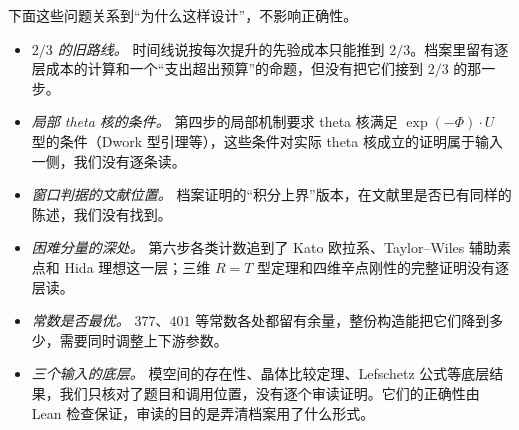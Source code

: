 \documentclass[11pt]{article}
\begin{document}
下面这些问题关系到“为什么这样设计”，不影响正确性。
\begin{itemize}
\item \emph{$2/3$ 的旧路线。} 时间线说按每次提升的先验成本只能推到 $2/3$。档案里留有逐层成本的计算和一个“支出超出预算”的命题，但没有把它们接到 $2/3$ 的那一步。
\item \emph{局部 theta 核的条件。} 第四步的局部机制要求 theta 核满足 $\exp(-\Phi)\cdot U$ 型的条件（Dwork 型引理等），这些条件对实际 theta 核成立的证明属于输入一侧，我们没有逐条读。
\item \emph{窗口判据的文献位置。} 档案证明的“积分上界”版本，在文献里是否已有同样的陈述，我们没有找到。
\item \emph{困难分量的深处。} 第六步各类计数追到了 Kato 欧拉系、Taylor–Wiles 辅助素点和 Hida 理想这一层；三维 $R=T$ 型定理和四维辛点刚性的完整证明没有逐层读。
\item \emph{常数是否最优。} $377$、$401$ 等常数各处都留有余量，整份构造能把它们降到多少，需要同时调整上下游参数。
\item \emph{三个输入的底层。} 模空间的存在性、晶体比较定理、Lefschetz 公式等底层结果，我们只核对了题目和调用位置，没有逐个审读证明。它们的正确性由 Lean 检查保证，审读的目的是弄清档案用了什么形式。
\end{itemize}


\end{document}
